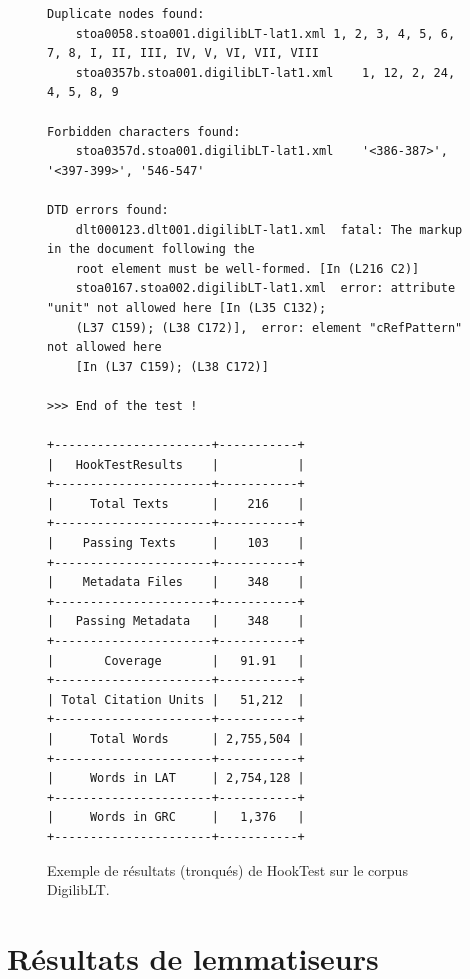 \begin{figure}
\begin{adjustbox}{width=.9\linewidth}
\begin{lstlisting}[breaklines=false,columns=fullflexible,keepspaces]
Duplicate nodes found:
	stoa0058.stoa001.digilibLT-lat1.xml	1, 2, 3, 4, 5, 6, 7, 8, I, II, III, IV, V, VI, VII, VIII
	stoa0357b.stoa001.digilibLT-lat1.xml	1, 12, 2, 24, 4, 5, 8, 9

Forbidden characters found:
	stoa0357d.stoa001.digilibLT-lat1.xml	'<386-387>', '<397-399>', '546-547'

DTD errors found:
	dlt000123.dlt001.digilibLT-lat1.xml	 fatal: The markup in the document following the 
	root element must be well-formed. [In (L216 C2)]
	stoa0167.stoa002.digilibLT-lat1.xml	 error: attribute "unit" not allowed here [In (L35 C132); 
	(L37 C159); (L38 C172)],  error: element "cRefPattern" not allowed here 
	[In (L37 C159); (L38 C172)]

>>> End of the test !

+----------------------+-----------+
|   HookTestResults    |           |
+----------------------+-----------+
|     Total Texts      |    216    |
+----------------------+-----------+
|    Passing Texts     |    103    |
+----------------------+-----------+
|    Metadata Files    |    348    |
+----------------------+-----------+
|   Passing Metadata   |    348    |
+----------------------+-----------+
|       Coverage       |   91.91   |
+----------------------+-----------+
| Total Citation Units |   51,212  |
+----------------------+-----------+
|     Total Words      | 2,755,504 |
+----------------------+-----------+
|     Words in LAT     | 2,754,128 |
+----------------------+-----------+
|     Words in GRC     |   1,376   |
+----------------------+-----------+
\end{lstlisting}
\end{adjustbox}
\caption{Exemple de résultats (tronqués) de HookTest sur le corpus DigilibLT.}
\label{fig:annx:digiliblt-hooktest}
\end{figure}

\section*{Résultats de lemmatiseurs}


